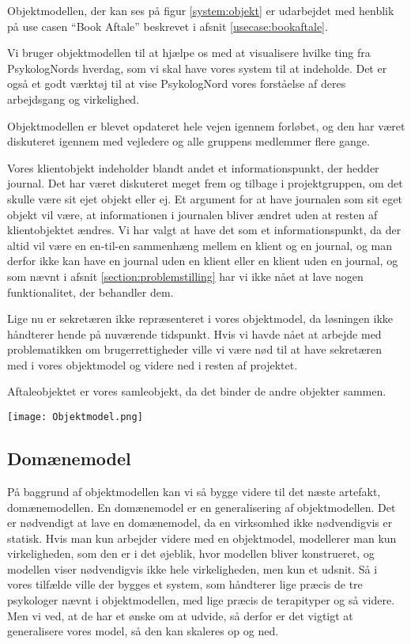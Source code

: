 Objektmodellen, der kan ses på figur \ref{system:objekt} er udarbejdet med henblik på use casen ``Book Aftale'' beskrevet i afsnit \ref{usecase:bookaftale}.

Vi bruger objektmodellen til at hjælpe os med at visualisere hvilke ting fra PsykologNords hverdag, som vi skal have vores system til at indeholde.
Det er også et godt værktøj til at vise PsykologNord vores forståelse af deres arbejdsgang og virkelighed.

Objektmodellen er blevet opdateret hele vejen igennem forløbet, og den har været diskuteret igennem med vejledere og alle gruppens medlemmer flere gange.

Vores klientobjekt indeholder blandt andet et informationspunkt, der hedder journal.
Det har været diskuteret meget frem og tilbage i projektgruppen, om det skulle være sit ejet objekt eller ej.
Et argument for at have journalen som sit eget objekt vil være, at informationen i journalen bliver ændret uden at resten af klientobjektet ændres.
Vi har valgt at have det som et informationspunkt, da der altid vil være en en-til-en sammenhæng mellem en klient og en journal, og man derfor ikke kan have en journal uden en klient eller en klient uden en journal, og som nævnt i afsnit \ref{section:problemstilling} har vi ikke nået at lave nogen funktionalitet, der behandler dem.

Lige nu er sekretæren ikke repræsenteret i vores objektmodel, da løsningen ikke håndterer hende på nuværende tidspunkt.
Hvis vi havde nået at arbejde med problematikken om brugerrettigheder ville vi være nød til at have sekretæren med i vores objektmodel og videre ned i resten af projektet.

Aftaleobjektet er vores samleobjekt, da det binder de andre objekter sammen.

\begin{sidewaysfigure}
    \caption{Objektmodel for Book Aftale}
    \centering
        \texttt{[image: Objektmodel.png]}
    \label{system:objekt}
\end{sidewaysfigure}

\subsection{Domænemodel}
\label{domaenemodel}

På baggrund af objektmodellen kan vi så bygge videre til det næste artefakt, domænemodellen.
En domænemodel er en generalisering af objektmodellen.
Det er nødvendigt at lave en domænemodel, da en virksomhed ikke nødvendigvis er statisk.
Hvis man kun arbejder videre med en objektmodel, modellerer man kun virkeligheden, som den er i det øjeblik, hvor modellen bliver konstrueret, og modellen viser nødvendigvis ikke hele virkeligheden, men kun et udsnit.
Så i vores tilfælde ville der bygges et system, som håndterer lige præcis de tre psykologer nævnt i objektmodellen, med lige præcis de terapityper og så videre.
Men vi ved, at de har et ønske om at udvide, så derfor er det vigtigt at generalisere vores model, så den kan skaleres op og ned.

